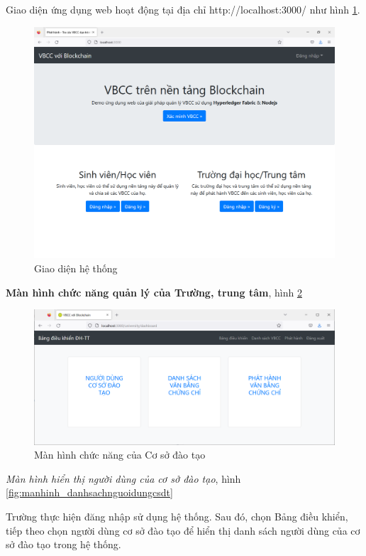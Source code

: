 Giao diện ứng dụng web hoạt động tại địa chỉ http://localhost:3000/ như hình \ref{fig:main_vbcc}. 

\begin{figure}[H]
\centering
\includegraphics[width=.9\linewidth]{img/main_vbcc.png}
\caption{Giao diện hệ thống}
\label{fig:main_vbcc}
\end{figure}

\textbf{Màn hình chức năng quản lý của Trường, trung tâm}, hình \ref{fig:manhinh_bangdieukhien}

\begin{figure}[H]
\centering
\includegraphics[width=.9\linewidth]{img/manhinh_bangdieukhien.png}
\caption{Màn hình chức năng của Cơ sở đào tạo}
\label{fig:manhinh_bangdieukhien}
\end{figure}

\emph{Màn hình hiển thị người dùng của cơ sở đào tạo}, hình \ref{fig:manhinh_danhsachnguoidungcsdt}

Trường thực hiện đăng nhập sử dụng hệ thống. Sau đó, chọn Bảng điều khiển, tiếp theo chọn người dùng cơ sở đào tạo để hiển thị danh sách người dùng của cơ sở đào tạo trong hệ thống.

